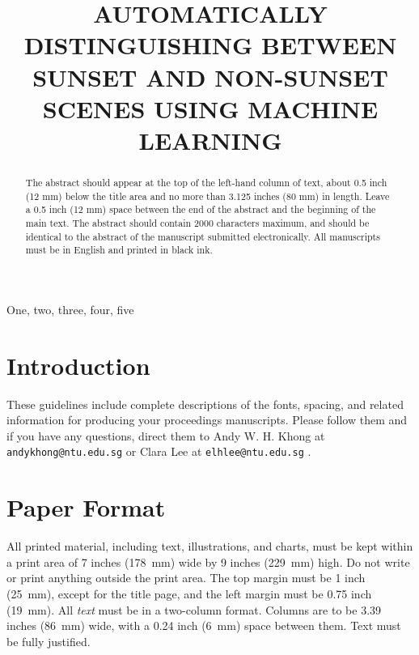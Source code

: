 \documentclass{article}
\begin{document}
\sloppy

\title{AUTOMATICALLY DISTINGUISHING BETWEEN SUNSET AND NON-SUNSET SCENES USING MACHINE LEARNING}
%
\address{Rose-Hulman Institute of Technology \\
Email: kampernj@rose-hulman.edu and henderea@rose-hulman.edu}


\maketitle
\thispagestyle{fancy} \fancyhead{} \lhead{}
 \cfoot{}
\renewcommand{\headrulewidth}{0pt}
\renewcommand{\footrulewidth}{0pt}




%
\begin{abstract}
The abstract should appear at the top of the left-hand column of
text, about 0.5 inch (12 mm) below the title area and no more than
3.125 inches (80 mm) in length.  Leave a 0.5 inch (12 mm) space
between the end of the abstract and the beginning of the main text.
The abstract should contain 2000 characters maximum, and should be
identical to the abstract of the manuscript submitted
electronically. All manuscripts must be in English and printed in
black ink.
\end{abstract}
%
\begin{keywords}
One, two, three, four, five
\end{keywords}
%
\section{Introduction}
\label{sec:intro}

These guidelines include complete descriptions of the fonts,
spacing, and related information for producing your proceedings
manuscripts. Please follow them and if you have any questions,
direct them to Andy W. H. Khong at \verb"andykhong@ntu.edu.sg" or
Clara Lee at \verb"elhlee@ntu.edu.sg" .

\section{Paper Format}
\label{sec:format}

All printed material, including text, illustrations, and charts,
must be kept within a print area of 7 inches (178~mm) wide by 9
inches (229~mm) high. Do not write or print anything outside the
print area. The top margin must be 1 inch (25~mm), except for the
title page, and the left margin must be 0.75 inch (19~mm).  All {\it
text} must be in a two-column format. Columns are to be 3.39 inches
(86~mm) wide, with a 0.24 inch (6~mm) space between them. Text must
be fully justified.
\end{document}
